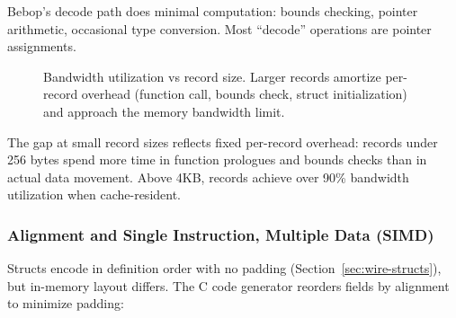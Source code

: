 \documentclass[10pt,onecolumn]{article}
\begin{document}
Bebop's decode path does minimal computation: bounds checking, pointer arithmetic, occasional type conversion. Most ``decode'' operations are pointer assignments.

\begin{figure}[ht]
\centering
{}
\caption{Bandwidth utilization vs record size. Larger records amortize per-record overhead (function call, bounds check, struct initialization) and approach the memory bandwidth limit.}
\label{fig:bandwidth-utilization}
\end{figure}

The gap at small record sizes reflects fixed per-record overhead: records under 256 bytes spend more time in function prologues and bounds checks than in actual data movement. Above 4KB, records achieve over 90\% bandwidth utilization when cache-resident.

\subsubsection{Alignment and Single Instruction, Multiple Data (SIMD)}

Structs encode in definition order with no padding (Section~\ref{sec:wire-structs}), but in-memory layout differs. The C code generator reorders fields by alignment to minimize padding:
\end{document}
